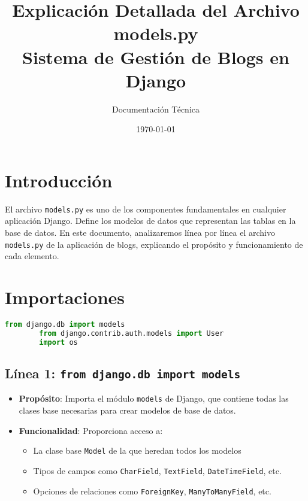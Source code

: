 \documentclass[12pt,a4paper]{article}
\title{\textbf{Explicación Detallada del Archivo models.py}\\
	\large Sistema de Gestión de Blogs en Django}
\author{Documentación Técnica}
\date{\today}
\begin{document}
	
	\maketitle
	\thispagestyle{empty}
	
	\newpage
	\tableofcontents
	\newpage
	
	\section{Introducción}
	
	El archivo \texttt{models.py} es uno de los componentes fundamentales en cualquier aplicación Django. Define los modelos de datos que representan las tablas en la base de datos. En este documento, analizaremos línea por línea el archivo \texttt{models.py} de la aplicación de blogs, explicando el propósito y funcionamiento de cada elemento.
	
	\section{Importaciones}
	
	\begin{lstlisting}[language=Python]
		from django.db import models
		from django.contrib.auth.models import User
		import os
	\end{lstlisting}
	
	\subsection{Línea 1: \texttt{from django.db import models}}
	\begin{itemize}
		\item \textbf{Propósito}: Importa el módulo \texttt{models} de Django, que contiene todas las clases base necesarias para crear modelos de base de datos.
		\item \textbf{Funcionalidad}: Proporciona acceso a:
		\begin{itemize}
			\item La clase base \texttt{Model} de la que heredan todos los modelos
			\item Tipos de campos como \texttt{CharField}, \texttt{TextField}, \texttt{DateTimeField}, etc.
			\item Opciones de relaciones como \texttt{ForeignKey}, \texttt{ManyToManyField}, etc.
		\end{itemize}
	\end{itemize}
	
\end{document}
